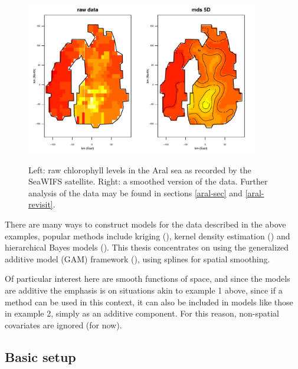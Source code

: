 \begin{figure}[tb]
\centering
\includegraphics[width=4in, trim=0in 0in 0in 0.3in, clip]{mds/figs/aral-5d-duchon.pdf}\\
\caption{Left: raw chlorophyll levels in the Aral sea as recorded by the SeaWIFS satellite. Right: a smoothed version of the data. Further analysis of the data may be found in sections \ref{aral-sec} and \ref{aral-revisit}.}
\label{aral-intro}
\end{figure}

There are many ways to construct models for the data described in the above examples, popular methods include kriging (\cite{diggle}), kernel density estimation (\cite{wandKDE}) and hierarchical Bayes models (\cite{banerjee}). This thesis concentrates on using the generalized additive model (GAM) framework (\cite{gammonograph}), using splines for spatial smoothing.

Of particular interest here are smooth functions of space, and since the models are additive the emphasis is on situations akin to example 1 above, since if a method can be used in this context, it can also be included in models like those in example 2, simply as an additive component. For this reason, non-spatial covariates are ignored (for now).

\subsection{Basic setup}

